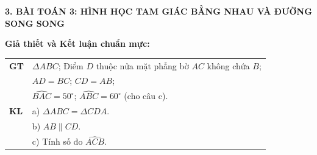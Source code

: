 \documentclass[12pt,a4paper]{article}
\begin{document}
\newpage

\noindent\textbf{\large 3. BÀI TOÁN 3: HÌNH HỌC TAM GIÁC BẰNG NHAU VÀ ĐƯỜNG SONG SONG}

\vspace{2mm}
\noindent
\begin{minipage}[t]{0.56\linewidth}
\textbf{Giả thiết và Kết luận chuẩn mực:}\\[1.5mm]
\begin{tabular}{|l|p{6.1cm}|}
\hline
\textbf{GT} & $\Delta ABC$; Điểm $D$ thuộc nửa mặt phẳng bờ $AC$ không chứa $B$; \\
& $AD = BC$; $CD = AB$; \\
& $\widehat{BAC} = 50^\circ$; $\widehat{ABC} = 60^\circ$ (cho câu c). \\
\hline
\textbf{KL} & a) $\Delta ABC = \Delta CDA$. \\
& b) $AB \parallel CD$. \\
& c) Tính số đo $\widehat{ACB}$. \\
\hline
\end{tabular}
\end{minipage}\hfill
\end{document}
